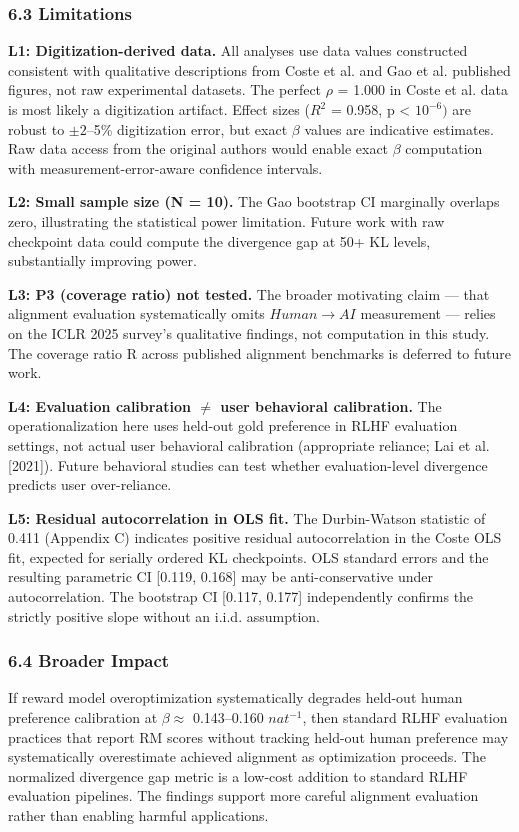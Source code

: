 \subsubsection{6.3 Limitations}

\textbf{L1: Digitization-derived data.} All analyses use data values constructed consistent with qualitative descriptions from Coste et al. and Gao et al. published figures, not raw experimental datasets. The perfect $\rho$ = 1.000 in Coste et al. data is most likely a digitization artifact. Effect sizes ($R^2$ = 0.958, p < $10^{-6})$ are robust to $\pm 2$--5\% digitization error, but exact $\beta$ values are indicative estimates. Raw data access from the original authors would enable exact $\beta$ computation with measurement-error-aware confidence intervals.

\textbf{L2: Small sample size (N = 10).} The Gao bootstrap CI marginally overlaps zero, illustrating the statistical power limitation. Future work with raw checkpoint data could compute the divergence gap at 50+ KL levels, substantially improving power.

\textbf{L3: P3 (coverage ratio) not tested.} The broader motivating claim --- that alignment evaluation systematically omits $Human\rightarrow AI$ measurement --- relies on the ICLR 2025 survey's qualitative findings, not computation in this study. The coverage ratio R across published alignment benchmarks is deferred to future work.

\textbf{L4: Evaluation calibration $\neq$ user behavioral calibration.} The operationalization here uses held-out gold preference in RLHF evaluation settings, not actual user behavioral calibration (appropriate reliance; Lai et al. [2021]). Future behavioral studies can test whether evaluation-level divergence predicts user over-reliance.

\textbf{L5: Residual autocorrelation in OLS fit.} The Durbin-Watson statistic of 0.411 (Appendix C) indicates positive residual autocorrelation in the Coste OLS fit, expected for serially ordered KL checkpoints. OLS standard errors and the resulting parametric CI [0.119, 0.168] may be anti-conservative under autocorrelation. The bootstrap CI [0.117, 0.177] independently confirms the strictly positive slope without an i.i.d. assumption.

\subsubsection{6.4 Broader Impact}

If reward model overoptimization systematically degrades held-out human preference calibration at $\beta \approx$ 0.143--0.160 $nat^{-1}$, then standard RLHF evaluation practices that report RM scores without tracking held-out human preference may systematically overestimate achieved alignment as optimization proceeds. The normalized divergence gap metric is a low-cost addition to standard RLHF evaluation pipelines. The findings support more careful alignment evaluation rather than enabling harmful applications.

